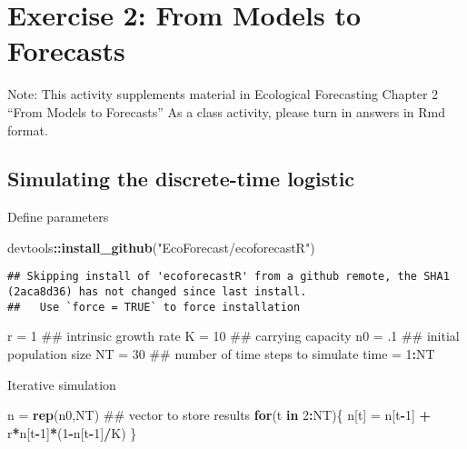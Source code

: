 \documentclass[]{article}
\title{}
\author{}
\date{}
\newenvironment{Shaded}{\begin{snugshade}}{\end{snugshade}}
\newcommand{\KeywordTok}[1]{\textcolor[rgb]{0.13,0.29,0.53}{\textbf{#1}}}
\newcommand{\DecValTok}[1]{\textcolor[rgb]{0.00,0.00,0.81}{#1}}
\newcommand{\StringTok}[1]{\textcolor[rgb]{0.31,0.60,0.02}{#1}}
\newcommand{\ControlFlowTok}[1]{\textcolor[rgb]{0.13,0.29,0.53}{\textbf{#1}}}
\newcommand{\OperatorTok}[1]{\textcolor[rgb]{0.81,0.36,0.00}{\textbf{#1}}}
\newcommand{\NormalTok}[1]{#1}
\begin{document}
\section{Exercise 2: From Models to
Forecasts}\label{exercise-2-from-models-to-forecasts}

Note: This activity supplements material in Ecological Forecasting
Chapter 2 ``From Models to Forecasts'' As a class activity, please turn
in answers in Rmd format.

\subsection{Simulating the discrete-time
logistic}\label{simulating-the-discrete-time-logistic}

Define parameters

\begin{Shaded}
\begin{Highlighting}[]
\NormalTok{devtools}\OperatorTok{::}\KeywordTok{install_github}\NormalTok{(}\StringTok{"EcoForecast/ecoforecastR"}\NormalTok{)}
\end{Highlighting}
\end{Shaded}

\begin{verbatim}
## Skipping install of 'ecoforecastR' from a github remote, the SHA1 (2aca8d36) has not changed since last install.
##   Use `force = TRUE` to force installation
\end{verbatim}

\begin{Shaded}
\begin{Highlighting}[]
\NormalTok{r =}\StringTok{ }\DecValTok{1}\NormalTok{         ## intrinsic growth rate}
\NormalTok{K =}\StringTok{ }\DecValTok{10}\NormalTok{        ## carrying capacity      }
\NormalTok{n0 =}\StringTok{ }\NormalTok{.}\DecValTok{1}\NormalTok{       ## initial population size}
\NormalTok{NT =}\StringTok{ }\DecValTok{30}\NormalTok{       ## number of time steps to simulate}
\NormalTok{time =}\StringTok{ }\DecValTok{1}\OperatorTok{:}\NormalTok{NT}
\end{Highlighting}
\end{Shaded}

Iterative simulation

\begin{Shaded}
\begin{Highlighting}[]
\NormalTok{n =}\StringTok{ }\KeywordTok{rep}\NormalTok{(n0,NT)    ## vector to store results}
\ControlFlowTok{for}\NormalTok{(t }\ControlFlowTok{in} \DecValTok{2}\OperatorTok{:}\NormalTok{NT)\{}
\NormalTok{  n[t] =}\StringTok{ }\NormalTok{n[t}\OperatorTok{-}\DecValTok{1}\NormalTok{] }\OperatorTok{+}\StringTok{ }\NormalTok{r}\OperatorTok{*}\NormalTok{n[t}\OperatorTok{-}\DecValTok{1}\NormalTok{]}\OperatorTok{*}\NormalTok{(}\DecValTok{1}\OperatorTok{-}\NormalTok{n[t}\OperatorTok{-}\DecValTok{1}\NormalTok{]}\OperatorTok{/}\NormalTok{K)}
\NormalTok{\}}
\end{Highlighting}
\end{Shaded}
\end{document}
